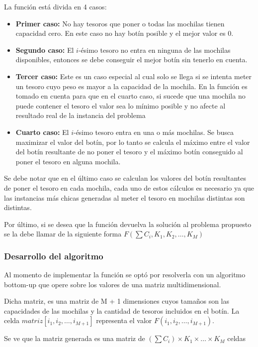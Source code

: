 \newpage
La función está divida en 4 casos:
\begin{itemize}
\item  \textbf{Primer caso:} No hay tesoros que poner o todas las mochilas tienen capacidad cero. En este caso no hay botín posible y el mejor valor es $0$.
\item  \textbf{Segundo caso:} El $i$-ésimo tesoro no entra en ninguna de las mochilas disponibles, entonces se debe conseguir el mejor botín sin tenerlo en cuenta.
\item \textbf{Tercer caso:} Este es un caso especial al cual solo se llega si se intenta meter un tesoro cuyo peso es mayor a la capacidad de la mochila. En la función es tomado en cuenta para que en el cuarto caso, si sucede que una mochila no puede contener el tesoro el valor sea lo mínimo posible y no afecte al resultado real de la instancia del problema
\item \textbf{Cuarto caso:} El $i$-ésimo tesoro entra en una o más mochilas. Se busca maximizar el valor del botín, por lo tanto se calcula el máximo entre el valor del botín resultante de no poner el tesoro y el máximo botín conseguido al poner el tesoro en alguna mochila.
\end{itemize}

Se debe notar que en el último caso se calculan los valores del botín resultantes de poner el tesoro en cada mochila, cada uno de estos cálculos es necesario ya que las instancias más chicas generadas al meter el tesoro en mochilas distintas son distintas.

Por último, si se desea que la función devuelva la solución al problema propuesto se la debe llamar de la siguiente forma $F\left(\sum C_i, K_1, K_2,\dots,K_M\right)$

\subsubsection{Desarrollo del algoritmo}
Al momento de implementar la función se optó por resolverla con un algoritmo bottom-up que opere sobre los valores de una matriz multidimensional.

Dicha matriz, es una matriz de M + 1 dimensiones cuyos tamaños son las capacidades de las mochilas y la cantidad de tesoros incluidos en el botín. La celda $matriz[i_1,i_2,\dots,i_{M+1}]$ representa el valor $F(i_1, i_2,\dots,i_{M+1})$.

Se ve que la matriz generada es una matriz de $\left(\sum C_i\right)\times K_1\times\dots\times K_M$ celdas

